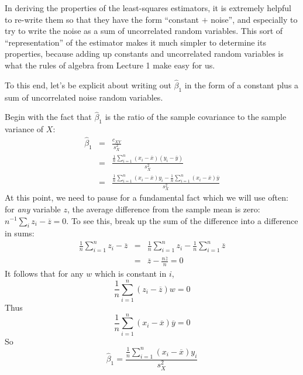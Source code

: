 \documentclass{article}
\begin{document}
In deriving the properties of the least-squares estimators, it is extremely
helpful to re-write them so that they have the form ``constant $+$ noise'', and
especially to try to write the noise as a sum of uncorrelated random variables.
This sort of ``representation'' of the estimator makes it much simpler to
determine its properties, because adding up constants and uncorrelated random
variables is what the rules of algebra from Lecture 1 make easy for us.

To this end, let's be explicit about writing out $\hat{\beta}_1$ in the
form of a constant plus a sum of uncorrelated noise random variables.

Begin with the fact that $\hat{\beta}_1$ is the ratio of the sample
covariance to the sample variance of $X$:
\begin{eqnarray}
\hat{\beta}_1 & = & \frac{c_{XY}}{s^2_X}\\
& = & \frac{\frac{1}{n}\sum_{i=1}^{n}{(x_i - \overline{x})(y_i - \overline{y})}}{s^2_X}\\
& = & \frac{\frac{1}{n}\sum_{i=1}^{n}{(x_i - \overline{x})y_i} - \frac{1}{n}\sum_{i=1}^{n}{(x_i - \overline{x})\overline{y}}}{s^2_X}
\end{eqnarray}
At this point, we need to pause for a fundamental fact which we will use often:
for {\em any} variable $z$,  the average difference from the sample mean is zero: $n^{-1}\sum_{i}{z_i - \overline{z}} = 0$.  To see this, break up the sum of
the difference into a difference in sums:
\begin{eqnarray}
\frac{1}{n}\sum_{i=1}^{n}{z_i -\overline{z}} & = & \frac{1}{n}\sum_{i=1}^{n}{z_i} - \frac{1}{n}\sum_{i=1}^{n}{\overline{z}}\\
& = & \overline{z} - \frac{n\overline{z}}{n} = 0
\end{eqnarray}
It follows that for any $w$ which is constant in $i$,
\begin{equation}
\label{eqn:average-difference-from-average-is-zero}
\frac{1}{n}\sum_{i=1}^{n}{(z_i - \overline{z})w} = 0
\end{equation}
Thus
\begin{equation}
 \frac{1}{n}\sum_{i=1}^{n}{(x_i - \overline{x})\overline{y}} = 0
\end{equation}
So
\begin{equation}
\label{eqn:hat-beta1-in-terms-of-yi} \hat{\beta}_1  =  \frac{\frac{1}{n}\sum_{i=1}^{n}{(x_i - \overline{x})y_i}}{s^2_X}
\end{equation}
\end{document}
